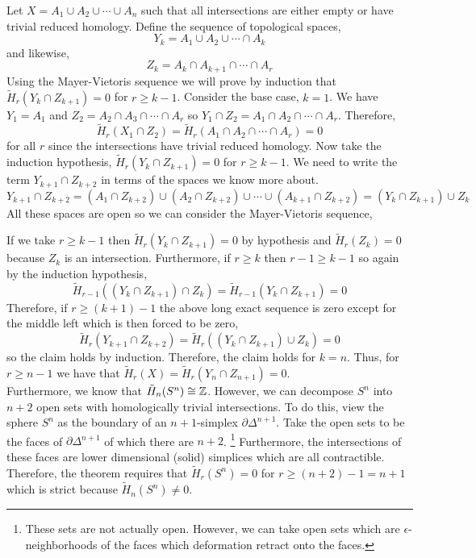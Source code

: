 \documentclass[12pt]{extarticle}
\begin{document}
Let $X = A_1 \cup A_2 \cup \cdots \cup A_n$ such that all intersections are either empty or have trivial reduced homology. Define the sequence of topological spaces,
\[Y_k = A_1 \cup A_2 \cup \cdots \cap A_k\]
and likewise,
\[Z_k = A_k \cap A_{k+1} \cap \cdots \cap A_r\] 
Using the Mayer-Vietoris sequence we will prove by induction that $\tilde{H}_r(Y_k \cap Z_{k+1}) = 0$ for $r \ge k - 1$. Consider the base case, $k = 1$. We have $Y_1 = A_1$ and $Z_{2} = A_2 \cap A_3 \cap \cdots \cap A_r$ so $Y_1 \cap Z_{2} = A_1 \cap A_2 \cap \cdots \cap A_r$. Therefore,
\[ \tilde{H}_r(X_{1} \cap Z_{2}) = \tilde{H}_r(A_1 \cap A_2 \cap \cdots \cap A_r) = 0 \]
for all $r$ since the intersections have trivial reduced homology. Now take the induction hypothesis, $\tilde{H}_r(Y_{k} \cap Z_{k+1}) = 0$ for $r \ge k - 1$. We need to write the term $Y_{k+1} \cap Z_{k+2}$ in terms of the spaces we know more about. 
\[ Y_{k+1} \cap Z_{k+2} = (A_1 \cap Z_{k+2}) \cup (A_2 \cap Z_{k+2}) \cup \cdots \cup (A_{k+1} \cap Z_{k+2}) = (Y_k \cap Z_{k+1}) \cup Z_k \] 
All these spaces are open so we can consider the Mayer-Vietoris sequence,
\begin{center}
\end{center}
If we take $r \ge k-1$ then $\tilde{H}_r(Y_k \cap Z_{k+1}) = 0$ by hypothesis and $\tilde{H}_r(Z_k) = 0$ because $Z_k$ is an intersection. Furthermore, if $r \ge k$ then $r-1 \ge k - 1$ so again by the induction hypothesis,
\[ \tilde{H}_{r-1}((Y_k \cap Z_{k+1}) \cap Z_k) = \tilde{H}_{r-1}(Y_k \cap Z_{k+1}) = 0 \]
Therefore, if $r \ge (k+1)-1$ the above long exact sequence is zero except for the middle left which is then forced to be zero,
\[ \tilde{H}_r(Y_{k+1} \cap Z_{k + 2}) = \tilde{H}_r((Y_k \cap Z_{k+1}) \cup Z_k) = 0 \]
so the claim holds by induction. Therefore, the claim holds for $k = n$. Thus, for $r \ge n - 1$ we have that $\tilde{H}_r(X) = \tilde{H}_r(Y_n \cap Z_{n + 1}) = 0$. 
\bigskip\\
Furthermore, we know that $\tilde{H}_{n}(S^n) \cong \mathbb{Z}$. However, we can decompose $S^n$ into $n + 2$ open sets with homologically trivial intersections. To do this, view the sphere $S^n$ as the boundary of an $n+1$-simplex $\partial \Delta^{n+1}$. Take the open sets to be the faces of $\partial \Delta^{n+1}$ of which there are $n+2$. \footnote{These sets are not actually open. However, we can take open sets which are $\epsilon$-neighborhoods of the faces which deformation retract onto the faces.} Furthermore, the intersections of these faces are lower dimensional (solid) simplices which are all contractible. Therefore, the theorem requires that $\tilde{H}_r(S^n) = 0$ for $r \ge (n+2)-1 = n+1$ which is strict because $\tilde{H}_n(S^n) \neq 0$.  
\end{document}
